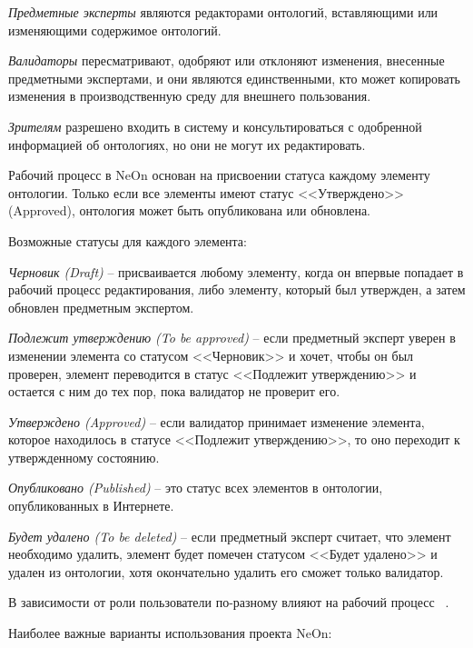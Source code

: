 \textit{Предметные эксперты} являются редакторами онтологий, вставляющими или изменяющими содержимое онтологий.

\textit{Валидаторы} пересматривают, одобряют или отклоняют изменения, внесенные предметными экспертами, и они являются единственными, кто может копировать изменения в производственную среду для внешнего пользования.

\textit{Зрителям} разрешено входить в систему и консультироваться с одобренной информацией об онтологиях, но они не могут их редактировать.

Рабочий процесс в NeOn основан на присвоении статуса каждому элементу онтологии. Только если все элементы имеют статус <<Утверждено>> (Approved), онтология может быть опубликована или обновлена.

Возможные статусы для каждого элемента: 

\textit{Черновик (Draft)} – присваивается любому элементу, когда он впервые попадает в рабочий процесс редактирования, либо элементу, который был утвержден, а затем обновлен предметным экспертом.

\textit{Подлежит утверждению (To be approved)} – если предметный эксперт уверен в изменении элемента со статусом <<Черновик>> и хочет, чтобы он был проверен, элемент переводится в статус <<Подлежит утверждению>> и остается с ним до тех пор, пока валидатор не проверит его.

\textit{Утверждено (Approved)} – если валидатор принимает изменение элемента, которое находилось в статусе <<Подлежит утверждению>>, то оно переходит к утвержденному состоянию.

\textit{Опубликовано (Published)} – это статус всех элементов в онтологии, опубликованных в Интернете.

\textit{Будет удалено (To be deleted)} – если предметный эксперт считает, что элемент необходимо удалить, элемент будет помечен статусом <<Будет удалено>> и удален из онтологии, хотя окончательно удалить его сможет только валидатор.

В зависимости от роли пользователи по-разному влияют на рабочий процесс ~\cite{Gomez2009}.

Наиболее важные варианты использования проекта NeOn:

